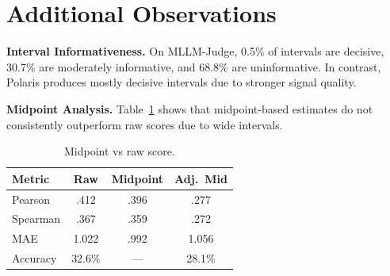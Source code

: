 \documentclass{article}
\begin{document}

\section{Additional Observations}

\textbf{Interval Informativeness.}
On MLLM-Judge, 0.5\% of intervals are decisive, 30.7\% are moderately informative, and 68.8\% are uninformative. In contrast, Polaris produces mostly decisive intervals due to stronger signal quality.

\textbf{Midpoint Analysis.}
Table~\ref{tab:midpoint} shows that midpoint-based estimates do not consistently outperform raw scores due to wide intervals.

\begin{table}[t]
\centering
\caption{Midpoint vs raw score.}
\label{tab:midpoint}
\small
\begin{tabular}{lccc}
\toprule
\textbf{Metric} & \textbf{Raw} & \textbf{Midpoint} & \textbf{Adj.\ Mid} \\
\midrule
Pearson & .412 & .396 & .277 \\
Spearman & .367 & .359 & .272 \\
MAE & 1.022 & .992 & 1.056 \\
Accuracy & 32.6\% & --- & 28.1\% \\
\bottomrule
\end{tabular}
\end{table}
\end{document}
